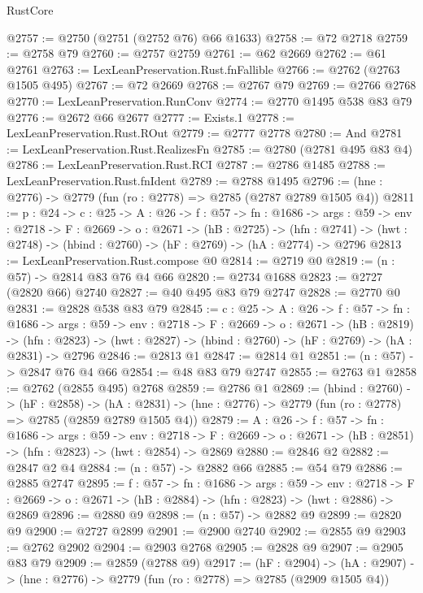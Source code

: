 \begin{lexlean}{RustCore}
\begin{coremodule}
@2757 := @2750 (@2751 (@2752 @76) @66 @1633)
@2758 := @72 @2718
@2759 := @2758 @79
@2760 := @2757 @2759
@2761 := @62 @2669
@2762 := @61 @2761
@2763 := LexLeanPreservation.Rust.fnFallible
@2766 := @2762 (@2763 @1505 @495)
@2767 := @72 @2669
@2768 := @2767 @79
@2769 := @2766 @2768
@2770 := LexLeanPreservation.RunConv
@2774 := @2770 @1495 @538 @83 @79
@2776 := @2672 @66 @2677
@2777 := Exists.{1}
@2778 := LexLeanPreservation.Rust.ROut
@2779 := @2777 @2778
@2780 := And
@2781 := LexLeanPreservation.Rust.RealizesFn
@2785 := @2780 (@2781 @495 @83 @4)
@2786 := LexLeanPreservation.Rust.RCI
@2787 := @2786 @1485
@2788 := LexLeanPreservation.Rust.fnIdent
@2789 := @2788 @1495
@2796 := (hne : @2776) -> @2779 (fun (ro : @2778) => @2785 (@2787 @2789 @1505 @4))
@2811 := {p : @24} ->
  {c : @25} ->
  {A : @26} ->
  {f : @57} ->
  {fn : @1686} ->
  {args : @59} ->
  {env : @2718} ->
  {F : @2669} ->
  {o : @2671} ->
  (hB : @2725) ->
  (hfn : @2741) -> (hwt : @2748) -> (hbind : @2760) -> (hF : @2769) -> (hA : @2774) -> @2796
@2813 := LexLeanPreservation.Rust.compose @0
@2814 := @2719 @0
@2819 := (n : @57) -> @2814 @83 @76 @4 @66
@2820 := @2734 @1688
@2823 := @2727 (@2820 @66) @2740
@2827 := @40 @495 @83 @79 @2747
@2828 := @2770 @0
@2831 := @2828 @538 @83 @79
@2845 := {c : @25} ->
  {A : @26} ->
  {f : @57} ->
  {fn : @1686} ->
  {args : @59} ->
  {env : @2718} ->
  {F : @2669} ->
  {o : @2671} ->
  (hB : @2819) ->
  (hfn : @2823) -> (hwt : @2827) -> (hbind : @2760) -> (hF : @2769) -> (hA : @2831) -> @2796
@2846 := @2813 @1
@2847 := @2814 @1
@2851 := (n : @57) -> @2847 @76 @4 @66
@2854 := @48 @83 @79 @2747
@2855 := @2763 @1
@2858 := @2762 (@2855 @495) @2768
@2859 := @2786 @1
@2869 := (hbind : @2760) ->
  (hF : @2858) ->
  (hA : @2831) -> (hne : @2776) -> @2779 (fun (ro : @2778) => @2785 (@2859 @2789 @1505 @4))
@2879 := {A : @26} ->
  {f : @57} ->
  {fn : @1686} ->
  {args : @59} ->
  {env : @2718} ->
  {F : @2669} -> {o : @2671} -> (hB : @2851) -> (hfn : @2823) -> (hwt : @2854) -> @2869
@2880 := @2846 @2
@2882 := @2847 @2 @4
@2884 := (n : @57) -> @2882 @66
@2885 := @54 @79
@2886 := @2885 @2747
@2895 := {f : @57} ->
  {fn : @1686} ->
  {args : @59} ->
  {env : @2718} ->
  {F : @2669} -> {o : @2671} -> (hB : @2884) -> (hfn : @2823) -> (hwt : @2886) -> @2869
@2896 := @2880 @9
@2898 := (n : @57) -> @2882 @9
@2899 := @2820 @9
@2900 := @2727 @2899
@2901 := @2900 @2740
@2902 := @2855 @9
@2903 := @2762 @2902
@2904 := @2903 @2768
@2905 := @2828 @9
@2907 := @2905 @83 @79
@2909 := @2859 (@2788 @9)
@2917 := (hF : @2904) ->
  (hA : @2907) -> (hne : @2776) -> @2779 (fun (ro : @2778) => @2785 (@2909 @1505 @4))

\end{coremodule}
\end{lexlean}
